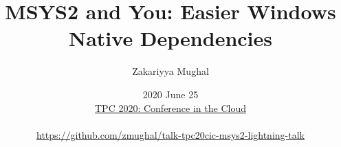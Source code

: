 \title[MSYS2 and You]{MSYS2 and You: Easier Windows Native Dependencies}
\author[Zaki Mughal]{Zakariyya Mughal}
\date[2020 June 25]{2020 June 25 \\[1ex]
\href{https://perlconference.us/tpc-2020-cloud/}{TPC 2020: Conference in the Cloud} \\[2ex]
\\[1ex]
\btVFill
%
{\footnotesize\url{https://github.com/zmughal/talk-tpc20cic-msys2-lightning-talk}}
}
